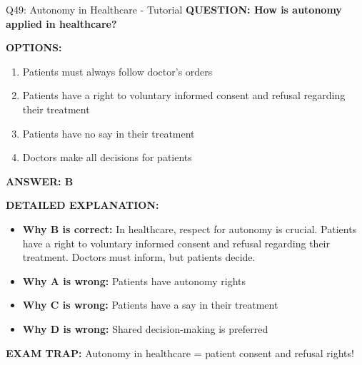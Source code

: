 \documentclass[8pt]{beamer}
\begin{document}
	\begin{frame}{Q49: Autonomy in Healthcare - Tutorial}
		\fontsize{6.5}{7.5}\selectfont
		\textbf{QUESTION: How is autonomy applied in healthcare?}
		
		\vspace{0.1cm}
		\textbf{OPTIONS:}
		\begin{enumerate}
			\item Patients must always follow doctor's orders
			\item Patients have a right to voluntary informed consent and refusal regarding their treatment
			\item Patients have no say in their treatment
			\item Doctors make all decisions for patients
		\end{enumerate}
		
		\vspace{0.1cm}
		\textcolor{myblue}{\textbf{ANSWER: B}}
		
		\vspace{0.1cm}
		\textbf{DETAILED EXPLANATION:}
		\begin{itemize}
			\item \textbf{Why B is correct:} In healthcare, respect for autonomy is crucial. Patients have a right to voluntary informed consent and refusal regarding their treatment. Doctors must inform, but patients decide.
			\item \textbf{Why A is wrong:} Patients have autonomy rights
			\item \textbf{Why C is wrong:} Patients have a say in their treatment
			\item \textbf{Why D is wrong:} Shared decision-making is preferred
		\end{itemize}
		
		\textcolor{myred}{\textbf{EXAM TRAP:}} Autonomy in healthcare = \textcolor{myblue}{patient consent and refusal rights}!
	\end{frame}
	
\end{document}
